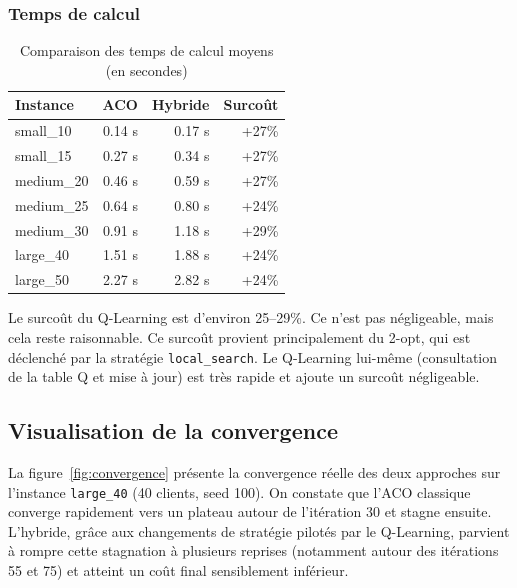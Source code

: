 \documentclass[12pt, a4paper]{article}
\begin{document}
\subsubsection{Temps de calcul}

\begin{table}[H]
\centering
\caption{Comparaison des temps de calcul moyens (en secondes)}
\label{tab:times}
\begin{tabular}{l r r r}
\toprule
\textbf{Instance} & \textbf{ACO} & \textbf{Hybride} & \textbf{Surcoût} \\
\midrule
small\_10 & 0.14 s & 0.17 s & +27\% \\
small\_15 & 0.27 s & 0.34 s & +27\% \\
medium\_20 & 0.46 s & 0.59 s & +27\% \\
medium\_25 & 0.64 s & 0.80 s & +24\% \\
medium\_30 & 0.91 s & 1.18 s & +29\% \\
large\_40 & 1.51 s & 1.88 s & +24\% \\
large\_50 & 2.27 s & 2.82 s & +24\% \\
\bottomrule
\end{tabular}
\end{table}

Le surcoût du Q-Learning est d'environ 25--29\%. Ce n'est pas négligeable, mais cela reste raisonnable. Ce surcoût provient principalement du 2-opt, qui est déclenché par la stratégie \texttt{local\_search}. Le Q-Learning lui-même (consultation de la table Q et mise à jour) est très rapide et ajoute un surcoût négligeable.

\subsection{Visualisation de la convergence}

La figure~\ref{fig:convergence} présente la convergence réelle des deux approches sur l'instance \texttt{large\_40} (40 clients, seed 100). On constate que l'ACO classique converge rapidement vers un plateau autour de l'itération 30 et stagne ensuite. L'hybride, grâce aux changements de stratégie pilotés par le Q-Learning, parvient à rompre cette stagnation à plusieurs reprises (notamment autour des itérations 55 et 75) et atteint un coût final sensiblement inférieur.
\end{document}
